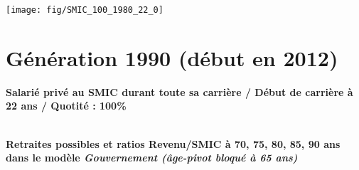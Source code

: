  \vspace{0.1cm} 

 {\hspace{-2.2cm}\texttt{[image: fig/SMIC\_100\_1980\_22\_0]}} 

\newpage 
 
\section{Génération 1990 (début en 2012)\label{SMIC_100_1990_22_0}} 
 
{\bf \noindent Salarié privé au SMIC durant toute sa carrière / Début de carrière à 22 ans / Quotité : 100\%}  ~ 

 ~\\{\bf \noindent Retraites possibles et ratios Revenu/SMIC à 70, 75, 80, 85, 90 ans dans le modèle \emph{Gouvernement (âge-pivot bloqué à 65 ans)}}  
 
